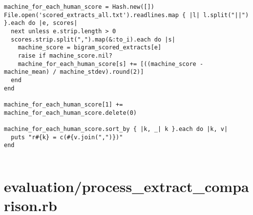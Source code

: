 \documentclass{article}
\begin{document}
\begin{verbatim}
machine_for_each_human_score = Hash.new([])
File.open('scored_extracts_all.txt').readlines.map { |l| l.split("||") }.each do |e, scores|
  next unless e.strip.length > 0
  scores.strip.split(",").map(&:to_i).each do |s|
    machine_score = bigram_scored_extracts[e]
    raise if machine_score.nil?
    machine_for_each_human_score[s] += [((machine_score - machine_mean) / machine_stdev).round(2)]
  end
end

machine_for_each_human_score[1] += machine_for_each_human_score.delete(0)

machine_for_each_human_score.sort_by { |k, _| k }.each do |k, v|
  puts "r#{k} = c(#{v.join(",")})"
end


\end{verbatim}
\pagebreak

\section*{evaluation/process\_extract\_comparison.rb}
\end{document}
